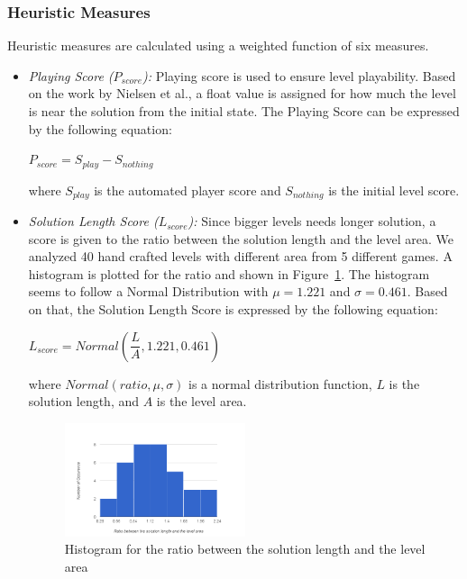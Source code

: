 \documentclass[letterpaper]{article}
\newcommand{\figref}[1]{Figure~\ref{Figure:#1}}
\begin{document}
\subsubsection{Heuristic Measures}
Heuristic measures are calculated using a weighted function of six measures.
\begin{itemize}
	\item \emph{Playing Score ($P_{score}$):} Playing score is used to ensure level playability. Based on the work by Nielsen et al.\cite{gvgpPerformanceProfiles}, a float value is assigned for how much the level is near the solution from the initial state. The Playing Score can be expressed by the following equation:
	\begin{center}$ P_{score} = S_{play} - S_{nothing}$\end{center}
	where $S_{play}$ is the automated player score and $S_{nothing}$ is the initial level score.
	
	\item\emph{Solution Length Score ($L_{score}$):} Since bigger levels needs longer solution, a score is given to the ratio between the solution length and the level area. We analyzed 40 hand crafted levels with different area from 5 different games. A histogram is plotted for the ratio and shown in \figref{solutionLengthHistogram}. The histogram seems to follow a Normal Distribution with $\mu = 1.221$ and $\sigma = 0.461$. Based on that, the Solution Length Score is expressed by the following equation:
	\begin{center}$L_{score} = Normal(\dfrac{L}{A}, 1.221, 0.461)$\end{center}
	where $Normal(ratio, \mu, \sigma)$ is a normal distribution function, $L$ is the solution length, and $A$ is the level area.
	\begin{figure}
		\centering
		\includegraphics[width=0.5\textwidth]{Images/solutionLengthHistogram}
		\caption{Histogram for the ratio between the solution length and the level area}
		\label{Figure:solutionLengthHistogram}
	\end{figure}
	

\end{itemize}
\end{document}
